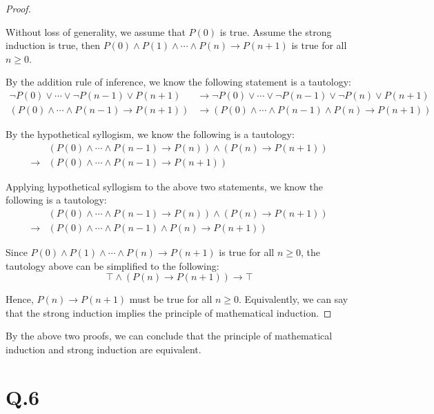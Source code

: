 \documentclass[a4paper,12pt]{article}
\begin{document}
\begin{proof}
$ $

Without loss of generality, we assume that $P(0)$ is true.
Assume the strong induction is true, then $P(0) \wedge P(1) \wedge \cdots \wedge P(n) \rightarrow P(n + 1)$ is true for all $n \geq 0$.

By the addition rule of inference, we know the following statement is a tautology:
\begin{align*}
	\neg P(0) \vee \cdots \vee \neg P(n - 1) \vee P(n + 1) &\rightarrow \neg P(0) \vee \cdots \vee \neg P(n - 1) \vee \neg P(n) \vee P(n + 1)	\\
	(P(0) \wedge \cdots \wedge P(n - 1) \rightarrow P(n + 1)) &\rightarrow (P(0) \wedge \cdots \wedge P(n - 1) \wedge P(n) \rightarrow P(n + 1))
\end{align*}

By the hypothetical syllogism, we know the following is a tautology:
\begin{align*}
	&(P(0) \wedge \cdots \wedge P(n - 1) \rightarrow P(n)) \wedge (P(n) \rightarrow P(n + 1)) \\
	\rightarrow& (P(0) \wedge \cdots \wedge P(n - 1) \rightarrow P(n + 1))
\end{align*}

Applying hypothetical syllogism to the above two statements, we know the following is a tautology:
\begin{align*}
	&(P(0) \wedge \cdots \wedge P(n - 1) \rightarrow P(n)) \wedge (P(n) \rightarrow P(n + 1)) \\
	\rightarrow& (P(0) \wedge \cdots \wedge P(n - 1) \wedge P(n) \rightarrow P(n + 1))
\end{align*}

Since $P(0) \wedge P(1) \wedge \cdots \wedge P(n) \rightarrow P(n + 1)$ is true for all $n \geq 0$, the tautology above can be simplified to the following:
\begin{equation*}
	\top \wedge (P(n) \rightarrow P(n + 1)) \rightarrow \top
\end{equation*}

Hence, $P(n) \rightarrow P(n + 1)$ must be true for all $n \geq 0$.
Equivalently, we can say that the strong induction implies the principle of mathematical induction.
\end{proof}

By the above two proofs, we can conclude that the principle of mathematical induction and strong induction are equivalent.

\section*{Q.6}
\end{document}
